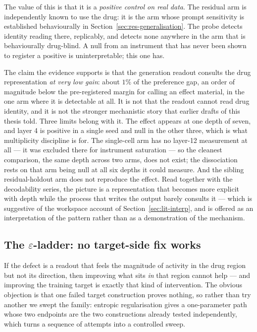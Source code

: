 The value of this is that it is a \emph{positive control on real data}. The residual arm is
independently known to use the drug: it is the arm whose prompt sensitivity is established
behaviourally in Section~\ref{sec:res-generalisation}. The probe detects identity reading there,
replicably, and detects none anywhere in the arm that is behaviourally drug-blind. A null from an
instrument that has never been shown to register a positive is uninterpretable; this one has.

The claim the evidence supports is that the generation readout consults the drug representation
\emph{at very low gain}: about $1\%$ of the preference gap, an order of magnitude below the
pre-registered margin for calling an effect material, in the one arm where it is detectable at all.
It is not that the readout cannot read drug identity, and it is not the stronger mechanistic story
that earlier drafts of this thesis told. Three limits belong with it. The effect appears at one
depth of seven, and layer 4 is positive in a single seed and null in the other three, which is what
multiplicity discipline is for. The single-cell arm has no layer-12 measurement at all --- it was
excluded there for instrument saturation --- so the cleanest comparison, the same depth across two
arms, does not exist; the dissociation rests on that arm being null at all six depths it could
measure. And the sibling residual-holdout arm does not reproduce the effect. Read together with
the decodability series, the picture is a representation that becomes more explicit with depth
while the process that writes the output barely consults it --- which is suggestive of the
workspace account of Section~\ref{sec:lit-interp}, and is offered as an interpretation of the
pattern rather than as a demonstration of the mechanism.

\subsection{The $\varepsilon$-ladder: no target-side fix works}
\label{sec:res-epsilon}

If the defect is a readout that feels the magnitude of activity in the drug region but not its
direction, then improving what sits \emph{in} that region cannot help --- and improving the training
target is exactly that kind of intervention. The obvious objection is that one failed target
construction proves nothing, so rather than try another we swept the family: entropic
regularisation gives a one-parameter path whose two endpoints are the two constructions already
tested independently, which turns a sequence of attempts into a controlled sweep.


